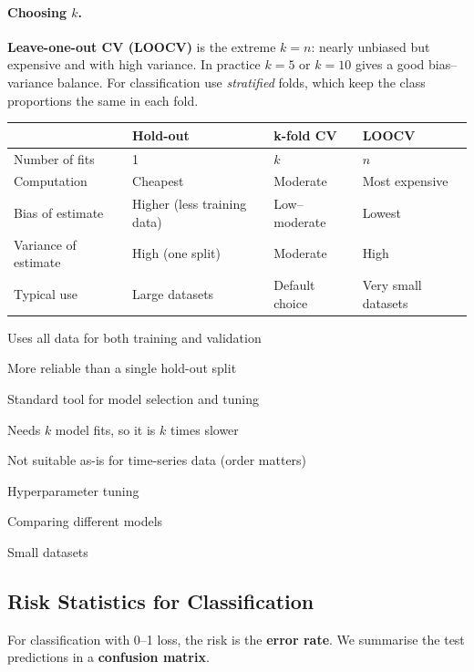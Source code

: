 \paragraph{Choosing $k$.} \textbf{Leave-one-out CV (LOOCV)} is the extreme $k=n$: nearly unbiased but expensive and with high variance. In practice $k=5$ or $k=10$ gives a good bias--variance balance. For classification use \emph{stratified} folds, which keep the class proportions the same in each fold.

\begin{center}
\begin{tabular}{@{}p{3.1cm}p{3.5cm}p{3.5cm}p{3.5cm}@{}}
\toprule
 & \textbf{Hold-out} & \textbf{k-fold CV} & \textbf{LOOCV}\\
\midrule
Number of fits & 1 & $k$ & $n$\\
Computation & Cheapest & Moderate & Most expensive\\
Bias of estimate & Higher (less training data) & Low--moderate & Lowest\\
Variance of estimate & High (one split) & Moderate & High\\
Typical use & Large datasets & Default choice & Very small datasets\\
\bottomrule
\end{tabular}
\end{center}

{\item Uses all data for both training and validation
 \item More reliable than a single hold-out split
 \item Standard tool for model selection and tuning}
{\item Needs $k$ model fits, so it is $k$ times slower
 \item Not suitable as-is for time-series data (order matters)}
{\item Hyperparameter tuning
 \item Comparing different models
 \item Small datasets}

\subsection{Risk Statistics for Classification}

For classification with 0--1 loss, the risk is the \textbf{error rate}. We summarise the test predictions in a \textbf{confusion matrix}.

